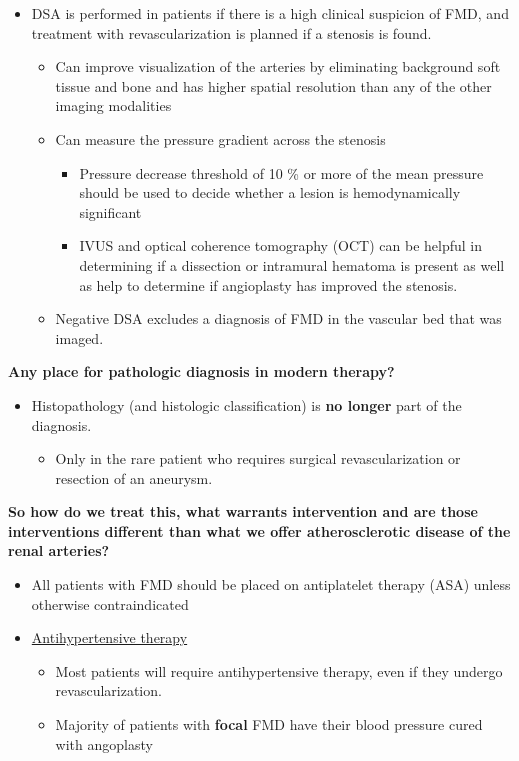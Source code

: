 \documentclass[
]{book}
\providecommand{\tightlist}{%
  \setlength{\itemsep}{0pt}\setlength{\parskip}{0pt}}
\begin{document}
\begin{itemize}
\item
  DSA is performed in patients if there is a high clinical suspicion
  of FMD, and treatment with revascularization is planned if a
  stenosis is found.

  \begin{itemize}
  \item
    Can improve visualization of the arteries by eliminating
    background soft tissue and bone and has higher spatial
    resolution than any of the other imaging modalities
  \item
    Can measure the pressure gradient across the stenosis

    \begin{itemize}
    \item
      Pressure decrease threshold of 10 \% or more of the mean
      pressure should be used to decide whether a lesion is
      hemodynamically significant
    \item
      IVUS and optical coherence tomography (OCT) can be helpful
      in determining if a dissection or intramural hematoma is
      present as well as help to determine if angioplasty has
      improved the stenosis.
    \end{itemize}
  \item
    Negative DSA excludes a diagnosis of FMD in the vascular bed
    that was imaged.
  \end{itemize}
\end{itemize}

\textbf{Any place for pathologic diagnosis in modern therapy?}

\begin{itemize}
\item
  Histopathology (and histologic classification) is \textbf{no longer} part
  of the diagnosis.

  \begin{itemize}
  \tightlist
  \item
    Only in the rare patient who requires surgical revascularization
    or resection of an aneurysm.
  \end{itemize}
\end{itemize}

\textbf{So how do we treat this, what warrants intervention and are those
interventions different than what we offer atherosclerotic disease of
the renal arteries?}

\begin{itemize}
\item
  All patients with FMD should be placed on antiplatelet therapy (ASA)
  unless otherwise contraindicated
\item
  \underline{Antihypertensive therapy}

  \begin{itemize}
  \item
    Most patients will require antihypertensive therapy, even if
    they undergo revascularization.
  \item
    Majority of patients with \textbf{focal} FMD have their blood
    pressure cured with angoplasty
  \end{itemize}
\end{itemize}
\end{document}
